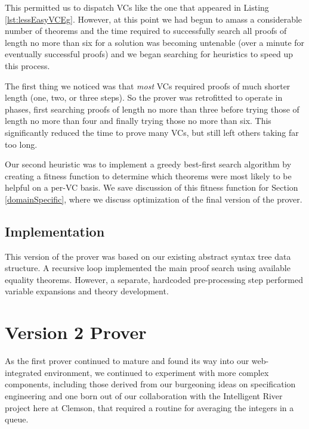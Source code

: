 This permitted us to dispatch VCs like the one that appeared in Listing \ref{lst:lessEasyVCEg}.  However, at this point we had begun to amass a considerable number of theorems and the time required to successfully search all proofs of length no more than six for a solution was becoming untenable (over a minute for eventually successful proofs) and we began searching for heuristics to speed up this process.

The first thing we noticed was that \emph{most} VCs required proofs of much shorter length (one, two, or three steps).  So the prover was retrofitted to operate in phases, first searching proofs of length no more than three before trying those of length no more than four and finally trying those no more than six.  This significantly reduced the time to prove many VCs, but still left others taking far too long.

Our second heuristic was to implement a greedy best-first search algorithm by creating a fitness function to determine which theorems were most likely to be helpful on a per-VC basis.  We save discussion of this fitness function for Section \ref{domainSpecific}, where we discuss optimization of the final version of the prover.

	\subsection{Implementation}

This version of the prover was based on our existing abstract syntax tree data structure.  A recursive loop implemented the main proof search using available equality theorems.  However, a separate, hardcoded pre-processing step performed variable expansions and theory development.


\section{Version 2 Prover\label{proverV2}}

As the first prover continued to mature and found its way into our web-integrated environment, we continued to experiment with more complex components, including those derived from our burgeoning ideas on specification engineering\cite{smithSpecificationAbstractions} and one born out of our collaboration with the Intelligent River project here at Clemson, that required a routine for averaging the integers in a queue\cite{regula2012case}.  

